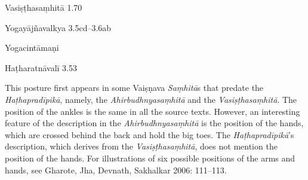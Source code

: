 \begin{ekdosis}
\begin{sources}[hp01_020]
Vasiṣṭhasaṃhitā 1.70

\begin{versinnote}
\end{versinnote}

Yogayājñavalkya 3.5cd–3.6ab

\begin{versinnote}
\end{versinnote}

\end{sources}

\begin{testimonia}[hp01_020]
Yogacintāmaṇi

\begin{versinnote}
\end{versinnote}

Haṭharatnāvalī 3.53

\begin{versinnote}
\end{versinnote}

\end{testimonia}

\begin{philcomm}[hp01_020]        
This posture first appears in some Vaiṣṇava \emph{Saṃhitā}s that predate the \emph{Haṭhapradīpikā}, namely, the \emph{Ahirbudhnyasaṃhitā} and the \emph{Vasiṣṭhasaṃhitā}. The position of the ankles is the same in all the source texts. However, an interesting feature of the description in the \emph{Ahirbudhnyasaṃhitā} is the position of the hands, which are crossed behind the back and hold the big toes. The \emph{Haṭhapradīpikā}’s description, which derives from the \emph{Vasiṣṭhasaṃhitā}, does not mention the position of the hands. For illustrations of six possible positions of the arms and hands, see Gharote, Jha, Devnath, Sakhalkar 2006: 111–113.
\end{philcomm}


\end{ekdosis}
